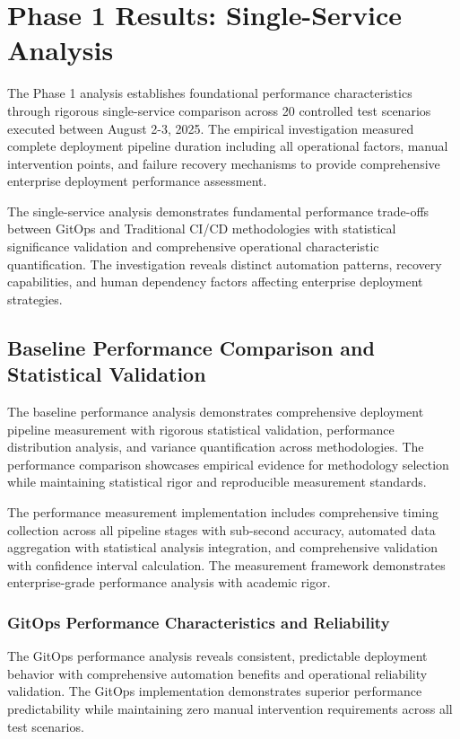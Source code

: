 \section{Phase 1 Results: Single-Service Analysis}
\label{sec:phase1_results}

The Phase 1 analysis establishes foundational performance characteristics through rigorous single-service comparison across 20 controlled test scenarios executed between August 2-3, 2025. The empirical investigation measured complete deployment pipeline duration including all operational factors, manual intervention points, and failure recovery mechanisms to provide comprehensive enterprise deployment performance assessment.

The single-service analysis demonstrates fundamental performance trade-offs between GitOps and Traditional CI/CD methodologies with statistical significance validation and comprehensive operational characteristic quantification. The investigation reveals distinct automation patterns, recovery capabilities, and human dependency factors affecting enterprise deployment strategies.

\subsection{Baseline Performance Comparison and Statistical Validation}
\label{subsec:baseline_performance}

The baseline performance analysis demonstrates comprehensive deployment pipeline measurement with rigorous statistical validation, performance distribution analysis, and variance quantification across methodologies. The performance comparison showcases empirical evidence for methodology selection while maintaining statistical rigor and reproducible measurement standards.

The performance measurement implementation includes comprehensive timing collection across all pipeline stages with sub-second accuracy, automated data aggregation with statistical analysis integration, and comprehensive validation with confidence interval calculation. The measurement framework demonstrates enterprise-grade performance analysis with academic rigor.

\subsubsection{GitOps Performance Characteristics and Reliability}

The GitOps performance analysis reveals consistent, predictable deployment behavior with comprehensive automation benefits and operational reliability validation. The GitOps implementation demonstrates superior performance predictability while maintaining zero manual intervention requirements across all test scenarios.

